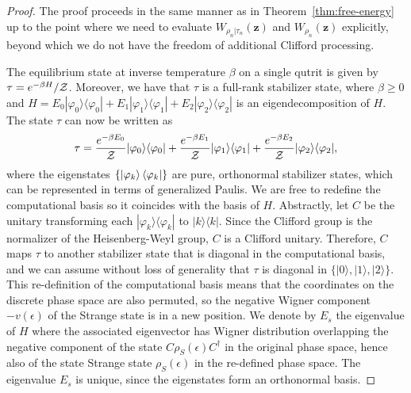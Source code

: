 \documentclass[
twocolumn,
superscriptaddress
]{revtex4-1}
\def\>{\rangle}
\def\<{\langle}
\def\z{\boldsymbol{z}}
\def\Z{{\cal Z}}
\begin{document}
\begin{proof}
The proof proceeds in the same manner as in Theorem~\ref{thm:free-energy} up to the point where we need to evaluate $W_{\rho_n |\tau_n} (\z)$ and $W_{\rho_n}(\z)$ explicitly, beyond which we do not have the freedom of additional Clifford processing.

The equilibrium state at inverse temperature $\beta$ on a single qutrit is given by $\tau = e^{-\beta H} / \Z$. Moreover, we have that $\tau$ is a full-rank stabilizer state, where $\beta \geq 0$ and $H = E_0 |\varphi_0\>\<\varphi_0| + E_1 |\varphi_1\>\<\varphi_1| + E_2 |\varphi_2\>\<\varphi_2|$ is an eigendecomposition of $H$.
The state $\tau$ can now be written as 
\begin{equation}
	\tau = \frac{e^{-\beta E_0}}{\Z} |\varphi_0\>\<\varphi_0| + \frac{e^{-\beta E_1}}{\Z} |\varphi_1\>\<\varphi_1| + \frac{e^{-\beta E_2}}{\Z} |\varphi_2\>\<\varphi_2|,
\end{equation}
where the eigenstates $\{\ket{\varphi_k}\<\varphi_k|\}$ are pure, orthonormal stabilizer states, which can be represented in terms of generalized Paulis. We are free to redefine the computational basis so it coincides with the basis of $H$. Abstractly, let $C$ be the unitary transforming each $|\varphi_k\>\<\varphi_k|$ to $|k\>\<k|$. Since the Clifford group is the normalizer of the Heisenberg-Weyl group, $C$ is a Clifford unitary. Therefore, $C$ maps $\tau$ to another stabilizer state that is diagonal in the computational basis, and we can assume without loss of generality that $\tau$ is diagonal in $\{|0\>,|1\>, |2\>\}$. This re-definition of the computational basis means that the coordinates on the discrete phase space are also permuted, so the negative Wigner component $-v(\epsilon)$ of the Strange state is in a new position. We denote by $E_s$ the eigenvalue of $H$ where the associated eigenvector has Wigner distribution overlapping the negative component of the state $C\rho_S(\epsilon)C^\dagger$ in the original phase space, hence also of the state Strange state $\rho_S(\epsilon)$ in the re-defined phase space. The eigenvalue $E_s$ is unique, since the eigenstates form an orthonormal basis.


\end{proof}
\end{document}
